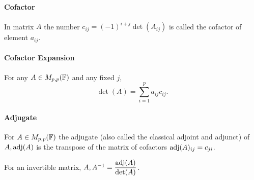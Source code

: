 \paragraph{Cofactor}
In matrix \(A\) the number \(c_{ij} = (-1)^{i+j}\det(A_{ij})\) is called the cofactor of element \(a_{ij}\).

\paragraph{Cofactor Expansion}
For any \(A \in M_{p,p}(\mathbb{F})\) and any fixed \(j\),
\[\det(A) = \sum_{i=1}^p a_{ij}c_{ij}.\]

\paragraph{Adjugate}
For \(A \in M_{p,p}(\mathbb{F})\) the adjugate (also called the classical adjoint and adjunct) of \(A, \mathrm{adj}(A)\) is the transpose of the matrix of cofactors \(\mathrm{adj}(A)_{ij} = c_{ji}\).

For an invertible matrix, \(A, A^{-1} = \dfrac{\mathrm{adj}(A)}{\det(A)}\).